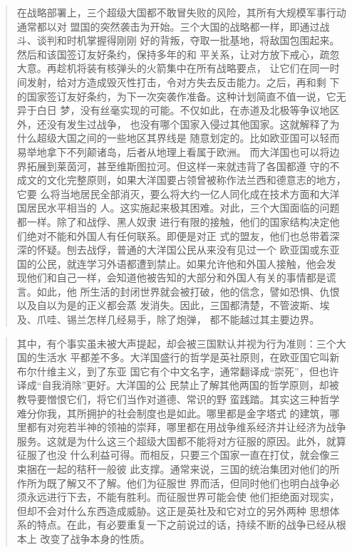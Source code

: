 \begin{quotation}
在战略部署上，三个超级大国都不敢冒失败的风险，其所有大规模军事行动通常都以对
盟国的突然袭击为开始。三个大国的战略都一样，即通过战斗、谈判和时机掌握得刚刚
好的背叛，夺取一批基地，将敌国包围起来。然后和该国签订友好条约，保持多年的和
平关系，让对方放下戒心，疏忽大意。再趁机将装有核弹头的火箭集中在所有战略要点，
让它们在同一时间发射，给对方造成毁灭性打击，令对方失去反击能力。之后，再和剩
下的国家签订友好条约，为下一次突袭作准备。这种计划简直不值一说，它无异于白日
梦，没有丝毫实现的可能。不仅如此，在赤道及北极等争议地区外，还没有发生过战争，
也没有哪个国家入侵过其他国家。这就解释了为什么超级大国之间的一些地区其界线是
随意划定的。比如欧亚国可以轻而易举地拿下不列颠诸岛，后者从地理上看属于欧洲。
而大洋国也可以将边界拓展到莱茵河，甚至维斯图拉河。但这样一来就违背了各国都遵
守的不成文的文化完整原则，如果大洋国要占领曾被称作法兰西和德意志的地方，它要
么将当地居民全部消灭，要么将大约一亿人同化成在技术方面和大洋国居民水平相当的
人。这实施起来极其困难。对此，三个大国面临的问题都一样。除了和战俘、黑人奴隶
进行有限的接触，他们的国家结构决定他们绝对不能和外国人有任何联系。即便是对正
式的盟友，他们也总带着深深的怀疑。刨去战俘，普通的大洋国公民从来没有见过一个
欧亚国或东亚国的公民，就连学习外语都遭到禁止。如果允许他和外国人接触，他会发
现他们和自己一样，会知道他被告知的大部分和外国人有关的事情都是谎言。如此，他
所生活的封闭世界就会被打破，他的信念，譬如恐惧、仇恨以及自以为是的正义都会蒸
发消失。因此，三国都清楚，不管波斯、埃及、爪哇、锡兰怎样几经易手，除了炮弹，
都不能越过其主要边界。
\end{quotation}

\begin{quotation}
其中，有个事实虽未被大声提起，却会被三国默认并视为行为准则：三个大国的生活水
平都差不多。大洋国盛行的哲学是英社原则，在欧亚国它叫新布尔什维主义，到了东亚
国它有个中文名字，通常翻译成``崇死''，但也许译成``自我消除''更好。大洋国的公
民禁止了解其他两国的哲学原则，却被教导要憎恨它们，将它们当作对道德、常识的野
蛮践踏。其实这三种哲学难分你我，其所拥护的社会制度也是如此。哪里都是金字塔式
的建筑，哪里都有对宛若半神的领袖的崇拜，哪里都在用战争维系经济并让经济为战争
服务。这就是为什么这三个超级大国都不能将对方征服的原因。此外，就算征服了也没
什么利益可得。而相反，只要三个国家一直在打仗，就会像三束捆在一起的秸秆一般彼
此支撑。通常来说，三国的统治集团对他们的所作所为既了解又不了解。他们为征服世
界而活，但同时他们也明白战争必须永远进行下去，不能有胜利。而征服世界可能会使
他们拒绝面对现实，但却不会对什么东西造成威胁。这正是英社及和它对立的另外两种
思想体系的特点。在此，有必要重复一下之前说过的话，持续不断的战争已经从根本上
改变了战争本身的性质。
\end{quotation}

